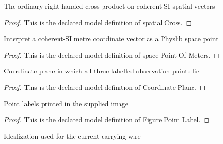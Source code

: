 \begin{definition}
  \label{def:physics:phyx-mini-0962:phyxminiproblems-problemphyxmini0962-spatialcross}
  The ordinary right-handed cross product on coherent-SI spatial vectors
\end{definition}
\begin{proof}
  This is the declared model definition of spatial Cross.
\end{proof}
\begin{definition}
  \label{def:physics:phyx-mini-0962:phyxminiproblems-problemphyxmini0962-spacepointofmeters}
  Interpret a coherent-SI metre coordinate vector as a Physlib space point
\end{definition}
\begin{proof}
  This is the declared model definition of space Point Of Meters.
\end{proof}
\begin{definition}
  \label{def:physics:phyx-mini-0962:phyxminiproblems-problemphyxmini0962-coordinateplane}
  Coordinate plane in which all three labelled observation points lie
\end{definition}
\begin{proof}
  This is the declared model definition of Coordinate Plane.
\end{proof}
\begin{definition}
  \label{def:physics:phyx-mini-0962:phyxminiproblems-problemphyxmini0962-figurepointlabel}
  Point labels printed in the supplied image
\end{definition}
\begin{proof}
  This is the declared model definition of Figure Point Label.
\end{proof}
\begin{definition}
  \label{def:physics:phyx-mini-0962:phyxminiproblems-problemphyxmini0962-straightwiremodel}
  Idealization used for the current-carrying wire
\end{definition}
